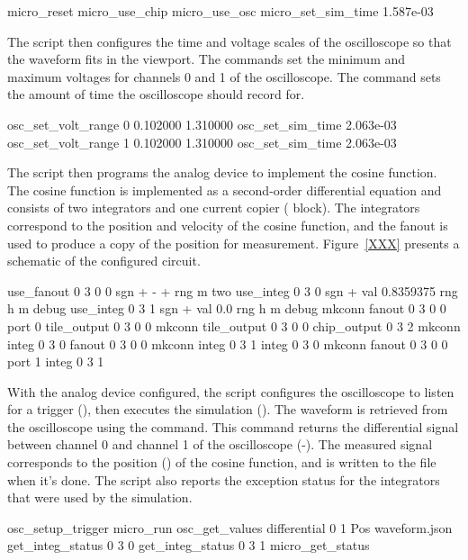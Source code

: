\begin{snippet}
\begin{snippet}
micro_reset
micro_use_chip
micro_use_osc
micro_set_sim_time 1.587e-03
\end{snippet}

The \grendel script then configures the time and voltage scales of the
oscilloscope so that the waveform fits in the viewport. The 
commands set the minimum and maximum voltages for channels 0 and 1 of the
oscilloscope. The  command sets the amount of time the
oscilloscope should record for.

\begin{snippet}
osc_set_volt_range 0 0.102000 1.310000
osc_set_sim_time 2.063e-03
osc_set_volt_range 1 0.102000 1.310000
osc_set_sim_time 2.063e-03
\end{snippet}

The \grendel script then programs the analog device to implement the cosine
function. The cosine function is implemented as a second-order differential
equation and consists of two integrators and one current copier (
block). The integrators correspond to the position and velocity of the cosine
function, and the fanout is used to produce a copy of the position for
measurement. Figure~\ref{XXX} presents a schematic of the configured circuit.

\begin{snippet}
use_fanout 0 3 0 0  sgn + - + rng m two
use_integ 0 3 0 sgn + val 0.8359375 rng h m debug
use_integ 0 3 1 sgn + val 0.0 rng h m debug
mkconn fanout 0 3 0 0 port 0 tile_output 0 3 0 0
mkconn tile_output 0 3 0 0 chip_output 0 3 2
mkconn integ 0 3 0 fanout 0 3 0 0
mkconn integ 0 3 1 integ 0 3 0
mkconn fanout 0 3 0 0 port 1 integ 0 3 1
\end{snippet}

With the analog device configured, the \grendel script configures the
oscilloscope to listen for a trigger (), then executes
the simulation (). The waveform is retrieved from the oscilloscope using the
 command. This command returns the differential signal
between channel 0 and channel 1 of the oscilloscope (-). The
measured signal corresponds to the position () of the cosine function,
and is written to the  file when it's done. The \grendel
script also reports the exception status for the integrators that were used by
the simulation. 

\begin{snippet}
osc_setup_trigger
micro_run
osc_get_values differential 0 1 Pos waveform.json
get_integ_status 0 3 0
get_integ_status 0 3 1
micro_get_status
\end{snippet}


\end{snippet}
